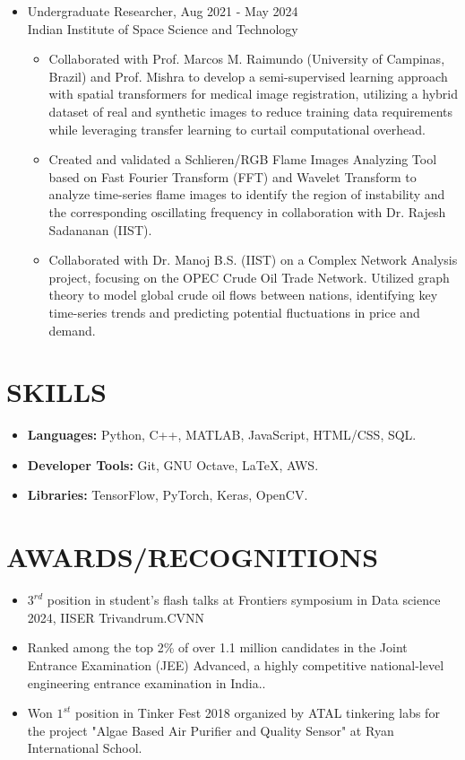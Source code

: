 \documentclass[11pt]{article}
\begin{document}
\begin{itemize}[leftmargin=*,noitemsep,topsep=0pt]
		\item Undergraduate Researcher, \hfill Aug 2021 - May 2024 \\
		Indian Institute of Space Science and Technology
		\begin{itemize}[leftmargin=*,noitemsep,topsep=0pt]
			\item Collaborated with Prof. Marcos M. Raimundo (University of Campinas, Brazil) and Prof. Mishra to develop a semi-supervised learning approach with spatial transformers for medical image registration, utilizing a hybrid dataset of real and synthetic images to reduce training data requirements while leveraging transfer learning to curtail computational overhead.	
			\item Created and validated a Schlieren/RGB Flame Images Analyzing Tool based on Fast Fourier Transform (FFT) and Wavelet Transform to analyze time-series flame images to identify the region of instability and the corresponding oscillating frequency in collaboration with Dr. Rajesh
			Sadananan (IIST).
			\item Collaborated with Dr. Manoj B.S. (IIST) on a Complex Network Analysis project, focusing on the OPEC Crude Oil Trade Network. Utilized graph theory to model global crude oil flows between nations, identifying key time-series trends and predicting potential fluctuations in price and demand.
		\end{itemize}
		\end{itemize}
	
	\section*{\bf SKILLS}
	\begin{itemize}[leftmargin=*,noitemsep,topsep=0pt]
		\item \textbf{Languages:} Python, C++, MATLAB, JavaScript, HTML/CSS, SQL.
		\item \textbf{Developer Tools:} Git, GNU Octave, LaTeX, AWS.
		\item \textbf{Libraries:} TensorFlow, PyTorch, Keras, OpenCV.
	\end{itemize}
	
	\section*{\bf AWARDS/RECOGNITIONS}
	\begin{itemize}[leftmargin=*,noitemsep,topsep=0pt]
		\item $3^{rd}$ position in student's flash talks at Frontiers symposium in Data science 2024, IISER Trivandrum.CVNN
		\item Ranked among the top 2\% of over 1.1 million candidates in the Joint Entrance Examination (JEE) Advanced, a highly competitive national-level engineering entrance examination in India..
		\item Won $1^{st}$ position in Tinker Fest 2018 organized by ATAL tinkering labs for the project "Algae Based Air Purifier and Quality Sensor" at Ryan International School.
	\end{itemize}
	
\end{document}

